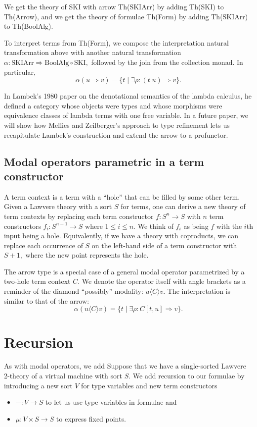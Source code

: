 \documentclass{article}
\newcommand{\maps}{\colon}
\newcommand{\lhom}{\Rightarrow}
\begin{document}
We get the theory of SKI with arrow Th(SKIArr) by adding Th(SKI) to Th(Arrow), and we get the theory of formulae Th(Form) by adding Th(SKIArr) to Th(BoolAlg).

To interpret terms from Th(Form), we compose the interpretation natural transformation above with another natural transformation $\alpha\maps \mathrm{SKIArr} \Rightarrow \mathrm{BoolAlg} \circ \mathrm{SKI},$ followed by the join from the collection monad.  In particular, 
\[ \alpha(u \lhom v) = \{ t \;|\; \exists \rho\maps (t\; u) \Rightarrow v \}. \]

In Lambek's 1980 paper on the denotational semantics of the lambda calculus, he defined a category whose objects were types and whose morphisms were equivalence classes of lambda terms with one free variable.  In a future paper, we will show how Mellies and Zeilberger's approach to type refinement lets us recapitulate Lambek's construction and extend the arrow to a profunctor.

\subsection{Modal operators parametric in a term constructor}

A term context is a term with a ``hole'' that can be filled by some other term.  Given a Lawvere theory with a sort $S$ for terms, one can derive a new theory of term contexts by replacing each term constructor $f\maps S^n \to S$ with $n$ term constructors $f_i\maps S^{n-1} \to S$ where $1 \le i \le n$.  We think of $f_i$ as being $f$ with the $i$th input being a hole.  Equivalently, if we have a theory with coproducts, we can replace each occurrence of $S$ on the left-hand side of a term constructor with $S+1,$ where the new point represents the hole.

The arrow type is a special case of a general modal operator parametrized by a two-hole term context $C.$  We denote the operator itself with angle brackets as a reminder of the diamond ``possibly'' modality: $u \langle C \rangle v.$  The interpretation is similar to that of the arrow:
\[ \alpha(u \langle C\rangle v) = \{ t \;|\; \exists \rho\maps C[t, u] \Rightarrow v \}. \]

\section{Recursion}

As with modal operators, we add Suppose that we have a single-sorted Lawvere 2-theory of a virtual machine with sort $S$.  We add recursion to our formulae by introducing a new sort $V$ for type variables and new term constructors 
\begin{itemize}
  \item $- \maps V \to S$ to let us use type variables in formulae and
  \item $\mu\maps V\times S \to S$ to express fixed points.
\end{itemize}
\end{document}
